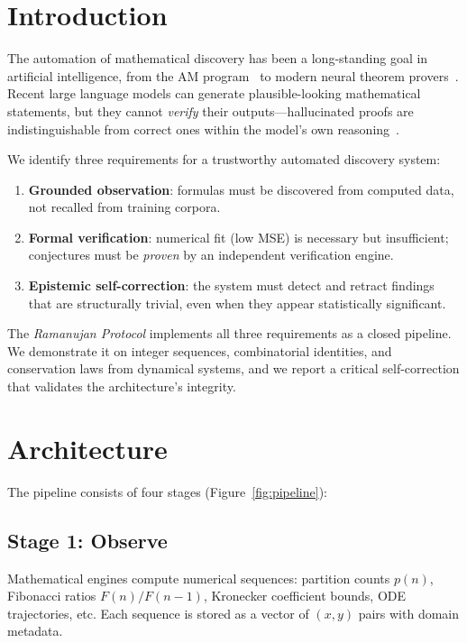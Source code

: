\documentclass[11pt,a4paper]{article}
\begin{document}
\section{Introduction}
\label{sec:intro}

The automation of mathematical discovery has been a long-standing goal in
artificial intelligence, from the AM program~\citep{lenat1977} to modern
neural theorem provers~\citep{lample2022}. Recent large language models can
generate plausible-looking mathematical statements, but they cannot
\emph{verify} their outputs---hallucinated proofs are indistinguishable from
correct ones within the model's own reasoning~\citep{frieder2023}.

We identify three requirements for a trustworthy automated discovery system:
\begin{enumerate}
  \item \textbf{Grounded observation}: formulas must be discovered from
    computed data, not recalled from training corpora.
  \item \textbf{Formal verification}: numerical fit (low MSE) is necessary
    but insufficient; conjectures must be \emph{proven} by an independent
    verification engine.
  \item \textbf{Epistemic self-correction}: the system must detect and
    retract findings that are structurally trivial, even when they appear
    statistically significant.
\end{enumerate}

The \emph{Ramanujan Protocol} implements all three requirements as a closed
pipeline. We demonstrate it on integer sequences, combinatorial identities,
and conservation laws from dynamical systems, and we report a critical
self-correction that validates the architecture's integrity.


\section{Architecture}
\label{sec:architecture}

The pipeline consists of four stages (Figure~\ref{fig:pipeline}):

\subsection{Stage 1: Observe}

Mathematical engines compute numerical sequences: partition counts $p(n)$,
Fibonacci ratios $F(n)/F(n{-}1)$, Kronecker coefficient bounds, ODE
trajectories, etc. Each sequence is stored as a vector of $(x, y)$ pairs
with domain metadata.
\end{document}

